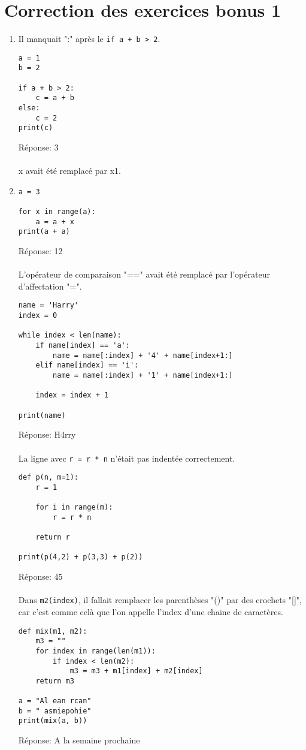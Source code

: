 \documentclass[12pt,a4paper]{article}
\newcommand{\codeintext}[1]{\texttt{#1}}
\newcommand{\response}[1]{Réponse: #1 \\\\}
\begin{document}
\section*{Correction des exercices bonus 1}

\begin{enumerate}

\item
Il manquait ":" après le \codeintext{if a + b > 2}.
\begin{lstlisting}
a = 1
b = 2

if a + b > 2:
	c = a + b
else:
	c = 2
print(c)
\end{lstlisting}
\response{3}

x avait été remplacé par x1.
\item
\begin{lstlisting}
a = 3

for x in range(a):
	a = a + x
print(a + a)   
\end{lstlisting}
\response{12}


L'opérateur de comparaison "==" avait été remplacé par l'opérateur d'affectation "=".
\begin{lstlisting}
name = 'Harry'
index = 0

while index < len(name):
	if name[index] == 'a':
		name = name[:index] + '4' + name[index+1:]
	elif name[index] == 'i':
		name = name[:index] + '1' + name[index+1:]

	index = index + 1

print(name)
\end{lstlisting}
\response{H4rry}


La ligne avec \codeintext{r = r * n} n'était pas indentée correctement.
\begin{lstlisting}
def p(n, m=1):
	r = 1
	
	for i in range(m):
		r = r * n

	return r

print(p(4,2) + p(3,3) + p(2)) 
\end{lstlisting}
\response{45}

Dans \codeintext{m2(index)}, il fallait remplacer les parenthèses "()" par des crochets "[]", car c'est comme celà que l'on appelle l'index d'une chaine de caractères.
\begin{lstlisting}
def mix(m1, m2):
	m3 = ""
	for index in range(len(m1)):
		if index < len(m2):
			m3 = m3 + m1[index] + m2[index]
	return m3
	
a = "Al ean rcan"
b = " asmiepohie"
print(mix(a, b)) 	

\end{lstlisting}
\response{A la semaine prochaine}

\end{enumerate}
\end{document}
